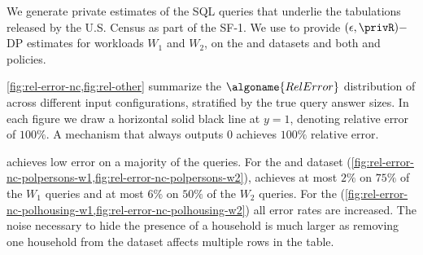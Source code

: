 


We generate private estimates of the SQL queries that underlie the tabulations released by the U.S. Census as part of the SF-1. 
We use \system to provide $(\epsilon, \privR)-$DP estimates for workloads $W_1$ and $W_2$, on the \dataPUMA and \dataNC datasets and both \persons and \housing policies.




\cref{fig:rel-error-nc,fig:rel-other} summarize the $\algoname{RelError}$ distribution of \system across  different input configurations, stratified by the true query answer sizes. In each figure we draw  a horizontal solid black line at $y = 1$, denoting relative error of $100\%$. A mechanism that always outputs 0 achieves $100\%$ relative error. 

\system achieves low error on a majority of the queries.  For the \personPolicy and \dataPUMA dataset (\cref{fig:rel-error-nc-polpersons-w1,fig:rel-error-nc-polpersons-w2}), \system achieves at most $2\%$  on $75\%$ of the $W_1$ queries and at most $6\%$  on $50\%$ of the $W_2$ queries. %
For the \householdPolicy (\cref{fig:rel-error-nc-polhousing-w1,fig:rel-error-nc-polhousing-w2}) all error rates are increased. The noise necessary to hide the presence of a household is much larger as removing one household from the dataset affects multiple rows in the \persons table. 

